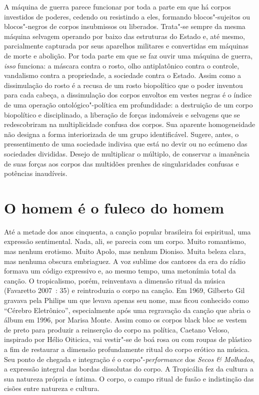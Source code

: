 A máquina de guerra parece funcionar por toda a parte em que há corpos
investidos de poderes, cedendo ou resistindo a eles, formando
blocos"-sujeitos ou blocos"-negros de corpos insubmissos ou liberados.
Trata"-se sempre da mesma máquina selvagem operando por baixo das
estruturas do Estado e, até mesmo, parcialmente capturada por seus
aparelhos militares e convertidas em máquinas de morte e abolição. Por
toda parte em que se faz ouvir uma máquina de guerra, \emph{isso
}funciona: a máscara contra o rosto, olho antiplatônico contra o
controle, vandalismo contra a propriedade, a sociedade contra o Estado.
Assim como a dissimulação do rosto é a recusa de um rosto biopolítico
que o poder inventou para cada cabeça, a dissimulação dos corpos
envoltos em vestes negras é o índice de uma operação ontológico"-política
em profundidade: a destruição de um corpo biopolítico e disciplinado, a
liberação de forças indomáveis e selvagens que se redescobriram na
multiplicidade confusa dos corpos. Sua aparente homogeneidade não
designa a forma interiorizada de um grupo identificável. Sugere, antes,
o pressentimento de uma sociedade indivisa que está no devir ou no
ecúmeno das sociedades divididas. Desejo de multiplicar o múltiplo, de
conservar a imanência de suas forças aos corpos das multidões prenhes de
singularidades confusas e potências inaudíveis.


\section{O homem é o fuleco do homem}

Até a metade dos anos cinquenta, a canção popular brasileira foi
espiritual, uma expressão sentimental. Nada, ali, se parecia com um
corpo. Muito romantismo, mas nenhum erotismo. Muito Apolo, mas nenhum
Dioniso. Muita beleza clara, mas nenhuma obscura embriaguez. A voz
sublime dos cantores da era do rádio formava um código expressivo e, ao
mesmo tempo, uma metonímia total da canção. O tropicalismo, porém,
reinventava a dimensão ritual da música (Favaretto 2007~: 35) e
reintroduzia o corpo na canção. Em 1969, Gilberto Gil gravava pela
Philips um  que levava apenas seu nome, mas ficou conhecido como
``Cérebro Eletrônico'', especialmente após uma regravação da canção que
abria o álbum em 1996, por Marisa Monte. Assim como os corpos black bloc
se vestem de preto para produzir a reinserção do corpo na política,
Caetano Veloso, inspirado por Hélio Oiticica, vai vestir"-se de boá rosa
ou com roupas de plástico a fim de restaurar a dimensão profundamente
ritual do corpo erótico na música. Seu ponto de chegada e integração é o
corpo"-\emph{performance} dos \emph{Secos \& Molhados}, a expressão
integral das bordas dissolutas do corpo. A Tropicália fez da cultura a
sua natureza própria e íntima. O corpo, o campo ritual de fusão e
indistinção das cisões entre natureza e cultura.

